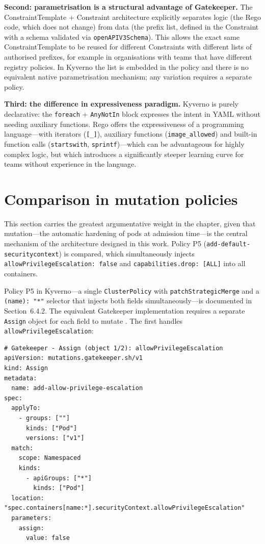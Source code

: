\textbf{Second: parametrisation is a structural advantage of Gatekeeper.} The ConstraintTemplate + Constraint architecture explicitly separates logic (the Rego code, which does not change) from data (the prefix list, defined in the Constraint with a schema validated via \texttt{openAPIV3Schema}). This allows the exact same ConstraintTemplate to be reused for different Constraints with different lists of authorised prefixes, for example in organisations with teams that have different registry policies. In Kyverno the list is embedded in the policy and there is no equivalent native parametrisation mechanism; any variation requires a separate policy.

\textbf{Third: the difference in expressiveness paradigm.} Kyverno is purely declarative: the \texttt{foreach} + \texttt{AnyNotIn} block expresses the intent in YAML without needing auxiliary functions. Rego offers the expressiveness of a programming language---with iterators (\texttt{[\_]}), auxiliary functions (\texttt{image\_allowed}) and built-in function calls (\texttt{startswith}, \texttt{sprintf})---which can be advantageous for highly complex logic, but which introduces a significantly steeper learning curve for teams without experience in the language.

\section{Comparison in mutation policies}

This section carries the greatest argumentative weight in the chapter, given that mutation---the automatic hardening of pods at admission time---is the central mechanism of the architecture designed in this work. Policy P5 (\texttt{add-default-securitycontext}) is compared, which simultaneously injects \texttt{allowPrivilegeEscalation:\,false} and \texttt{capabilities.drop:\,[ALL]} into all containers.

Policy P5 in Kyverno---a single \texttt{ClusterPolicy} with \texttt{patchStrategicMerge} and a \texttt{(name):\,"*"} selector that injects both fields simultaneously---is documented in Section~6.4.2. The equivalent Gatekeeper implementation requires a separate \texttt{Assign} object for each field to mutate \cite{gatekeeper_mutation}. The first handles \texttt{allowPrivilegeEscalation}:

\begin{lstlisting}
# Gatekeeper - Assign (object 1/2): allowPrivilegeEscalation
apiVersion: mutations.gatekeeper.sh/v1
kind: Assign
metadata:
  name: add-allow-privilege-escalation
spec:
  applyTo:
    - groups: [""]
      kinds: ["Pod"]
      versions: ["v1"]
  match:
    scope: Namespaced
    kinds:
      - apiGroups: ["*"]
        kinds: ["Pod"]
  location: "spec.containers[name:*].securityContext.allowPrivilegeEscalation"
  parameters:
    assign:
      value: false
\end{lstlisting}

